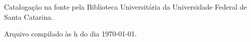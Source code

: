 

\begin{fichacatalografica}
    \vspace*{\fill}

    \begin{center}

        Catalogação na fonte pela Biblioteca Universitária da Universidade Federal de Santa Catarina.

        Arquivo compilado às \currenttime h do dia \today.

\end{center}
\end{fichacatalografica}
